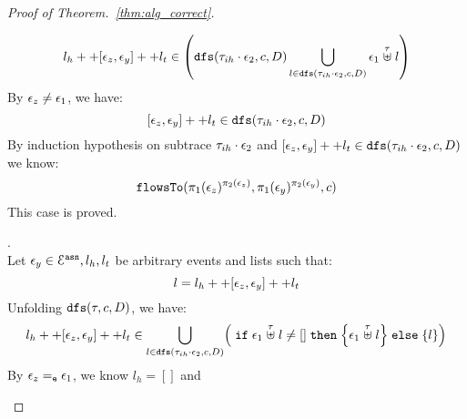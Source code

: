 \begin{proof}[Proof of Theorem.~\ref{thm:alg_correct}]
\begin{case}
\begin{subcase}
\begin{subsubcase}
\[
  l_h ++ [\event_z, \event_y] ++ l_t  \in 
  \left(  \kw{dfs}(\trace_{ih} \cdot \event_2, c, D) \bigcup\limits_{l \in \kw{dfs}(\trace_{ih} \cdot \event_2, c, D) } \event_1 \stackrel{\trace}{\uplus} l 
  \right)
\]
%
By $\mathtt{\epsilon}_z \neq \mathtt{\epsilon}_1$, we have:
\[
  [\mathtt{\epsilon}_z, \mathtt{\epsilon}_y] ++ l_t \in \mathtt{dfs}(\mathtt{\tau}_{ih} \cdot \mathtt{\epsilon}_2, c, D)
\]
%
%
%
By induction hypothesis on subtrace $\mathtt{\tau}_{ih} \cdot \mathtt{\epsilon}_2$ and $[\mathtt{\epsilon}_z, \mathtt{\epsilon}_y] ++ l_t 
  \in \mathtt{dfs}(\mathtt{\tau}_{ih} \cdot \mathtt{\epsilon}_2, c, D)$ we know:
\[
  \mathtt{flowsTo}(\pi_1(\mathtt{\epsilon}_z)^{\pi_2(\mathtt{\epsilon}_z)}, \pi_1(\mathtt{\epsilon}_y)^{\pi_2(\mathtt{\epsilon}_y)}, c)
\]
This case is proved.
%
\end{subsubcase}
%
\begin{subsubcase}.
\\
Let $\mathtt{\epsilon}_y \in \mathcal{E}^{\mathtt{{asn}}}, l_h, l_t$ be arbitrary events and lists such that:
\[                                                                                                                                                                                                                                                                                                                                                                                                          
  l = l_h ++ [\mathtt{\epsilon}_z, \mathtt{\epsilon}_y] ++ l_t 
\]
%
Unfolding $\mathtt{dfs}(\mathtt{\tau}, c, D)$, we have:
%
\[
  l_h ++ [\event_z, \event_y] ++ l_t  \in 
     \bigcup\limits_{l \in \kw{dfs}(\trace_{ih} \cdot \event_2, c, D) }
  \left(  \eif \event_1 \stackrel{\trace}{\uplus} l \neq [] 
  \ethen \left\{ \event_1 \stackrel{\trace}{\uplus} l \right\} \eelse \left\{ l \right\}
  \right)
  \]
By $\mathtt{\epsilon}_z =_{\mathtt{e}} \mathtt{\epsilon}_1$, we know $l_h = []$ and 

\end{subsubcase}
\end{subcase}
\end{case}
\end{proof}
